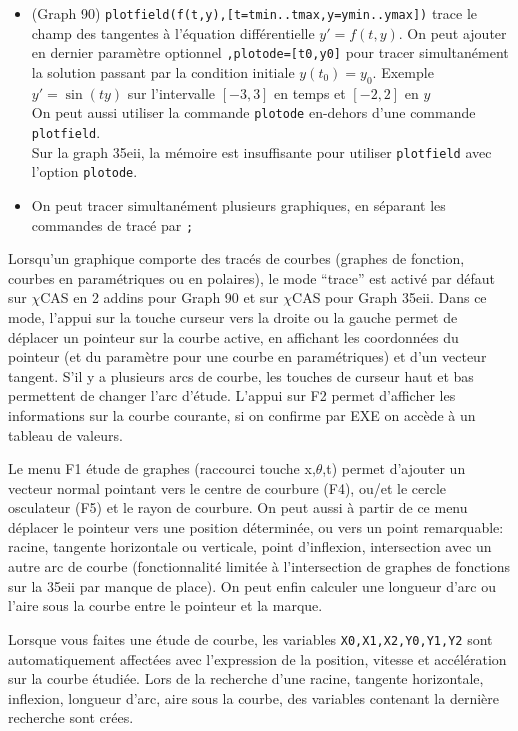 \documentclass{article}
\begin{document}
\begin{giacjshere}
\begin{itemize}
\item (Graph 90)
\verb|plotfield(f(t,y),[t=tmin..tmax,y=ymin..ymax])|
trace le champ des tangentes \`a l'\'equation diff\'erentielle
$y'=f(t,y)$. On peut ajouter en dernier param\`etre
optionnel \verb|,plotode=[t0,y0]|
pour tracer simultan\'ement la solution passant par la condition
initiale $y(t_0)=y_0$. Exemple $y'=\sin(ty)$ sur l'intervalle $[-3,3]$
en temps et $[-2,2]$ en $y$\\
On peut aussi utiliser la commande \verb|plotode| en-dehors d'une commande
\verb|plotfield|.\\
Sur la graph 35eii, 
la m\'emoire est insuffisante pour utiliser \verb|plotfield|
avec l'option \verb|plotode|.
\item On peut tracer simultan\'ement plusieurs graphiques, en s\'eparant
les commandes de trac\'e par \verb|;|
\end{itemize}
Lorsqu'un graphique comporte des trac\'es de courbes (graphes de
fonction, courbes en param\'etriques ou en polaires), le mode
``trace'' est activ\'e par d\'efaut sur $\chi$CAS en 2 addins pour Graph 90
et sur $\chi$CAS pour Graph 35eii. Dans ce mode, l'appui sur la
touche curseur vers la droite ou la gauche permet de d\'eplacer
un pointeur sur la courbe active, en affichant les coordonn\'ees
du pointeur (et du param\`etre pour une courbe en param\'etriques)
et d'un vecteur tangent. S'il y a plusieurs arcs de courbe, les
touches de curseur haut et bas permettent de changer l'arc d'\'etude.
L'appui sur F2 permet d'afficher les informations sur la courbe
courante, si on confirme par EXE on acc\`ede \`a un tableau de valeurs.

Le menu F1 \'etude de graphes (raccourci touche x,$\theta$,t)
permet d'ajouter un vecteur normal pointant vers le centre de courbure
(F4),
ou/et le cercle osculateur (F5) et le rayon de courbure. On peut
aussi \`a partir de ce menu d\'eplacer le pointeur vers une position d\'etermin\'ee, ou
vers un point remarquable: racine, tangente horizontale ou verticale,
point d'inflexion, intersection avec un autre arc de courbe 
(fonctionnalit\'e limit\'ee \`a l'intersection de graphes de fonctions 
sur la 35eii par manque de place). On peut
enfin calculer une longueur d'arc ou l'aire sous la courbe entre
le pointeur et la marque. 

Lorsque vous faites une \'etude de courbe, les variables
\verb|X0,X1,X2,Y0,Y1,Y2|
sont automatiquement affect\'ees avec l'expression de la position, vitesse
et acc\'el\'eration sur la courbe \'etudi\'ee. Lors de la recherche
d'une racine, tangente horizontale, inflexion, longueur d'arc, aire
sous la courbe, des variables contenant la derni\`ere recherche
sont cr\'ees.


\end{giacjshere}
\end{document}
